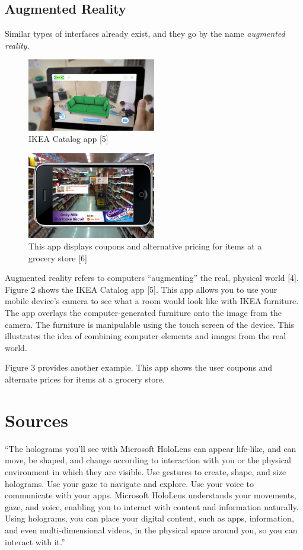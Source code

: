 \documentclass[a4paper,12pt]{article}
\begin{document}
\subsection{Augmented Reality}


Similar types of interfaces already exist, and they go by the name \emph{augmented reality}. 
\begin{figure}
\centering
\includegraphics[width=0.5\textwidth]{ikea}
\caption{IKEA Catalog app [5]}
\end{figure}
\begin{figure}
\centering
\includegraphics[width=0.5\textwidth]{coupons}
\caption{This app displays coupons and alternative pricing for items at a grocery store [6]}
\end{figure}
Augmented reality refers to computers ``augmenting'' the real, physical world [4]. Figure 2 shows the IKEA Catalog app [5]. This app allows you to use your mobile device's camera to see what a room would look like with IKEA furniture. The app overlays the computer-generated furniture onto the image from the camera. The furniture is manipulable using the touch screen of the device. This illustrates the idea of combining computer elements and images from the real world.

Figure 3 provides another example. This app shows the user coupons and alternate prices for items at a grocery store.

\section{Sources}

``The holograms you'll see with Microsoft HoloLens can appear life-like, and can move, be shaped, and change according to interaction with you or the physical environment in which they are visible. Use gestures to create, shape, and size holograms. Use your gaze to navigate and explore. Use your voice to communicate with your apps. Microsoft HoloLens understands your movements, gaze, and voice, enabling you to interact with content and information naturally. Using holograms, you can place your digital content, such as apps, information, and even multi-dimensional videos, in the physical space around you, so you can interact with it.''
\end{document}
